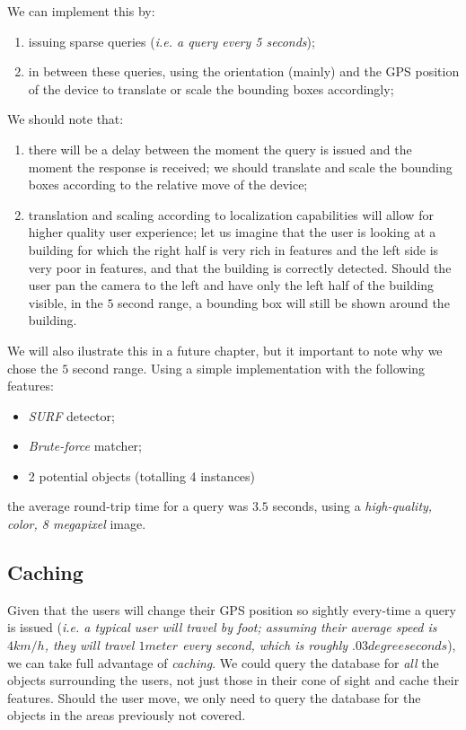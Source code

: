 \documentclass[a4paper,onecolumn,oneside,titlepage,12pt]{report}
\begin{document}
We can implement this by:
\begin{enumerate}
	\item issuing sparse queries (\emph{i.e. a query every 5 seconds});
	\item in between these queries, using the orientation (mainly) and the GPS position of the device to translate or scale the bounding boxes accordingly;
\end{enumerate}
We should note that:
\begin{enumerate}
	\item there will be a delay between the moment the query is issued and the moment the response is received; we should translate and scale the bounding boxes according to the relative move of the device;
	\item translation and scaling according to localization capabilities will allow for higher quality user experience; let us imagine that the user is looking at a building for which the right half is very rich in features and the left side is very poor in features, and that the building is correctly detected. Should the user pan the camera to the left and have only the left half of the building visible, in the $5$ second range, a bounding box will still be shown around the building.
\end{enumerate}
We will also ilustrate this in a future chapter, but it important to note why we chose the $5$ second range. Using a simple implementation with the following features:
\begin{itemize}
	\item \emph{SURF} detector;
	\item \emph{Brute-force} matcher;
	\item 2 potential objects (totalling 4 instances)
\end{itemize}
the average round-trip time for a query was $3.5$ seconds, using a \emph{high-quality, color, 8 megapixel} image.

\subsection{Caching}
Given that the users will change their GPS position so sightly every-time a query is issued (\emph{i.e. a typical user will travel by foot; assuming their average speed is $4 km/h$, they will travel $1 meter$ every second, which is roughly $.03 degree seconds$}), we can take full advantage of \emph{caching}. We could query the database for \emph{all} the objects surrounding  the users, not just those in their cone of sight and cache their features. Should the user move, we only need to query the database for the objects in the areas previously not covered.
\end{document}
